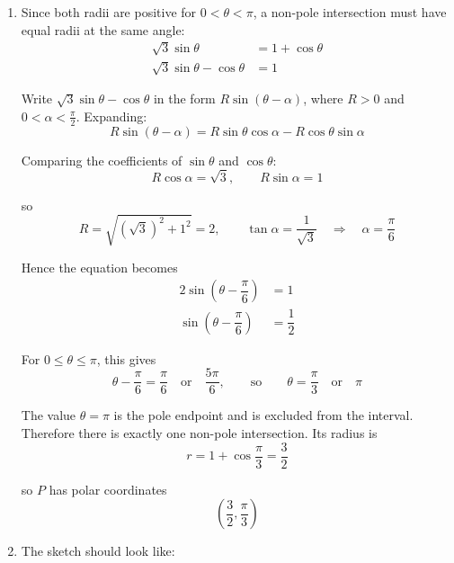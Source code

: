 \documentclass[leqno]{article}
\begin{document}
\begin{enumerate}[
  label=\textbf{\arabic*.},
  leftmargin=*,
  topsep=0pt,
  partopsep=0pt,
  parsep=0pt
]
\begin{djsSolution}
\begin{enumerate}[label=\textbf{(\alph*)}, start=1]
At a non-pole point, \(r\ne0\), so division by \(r\) gives
\[
r=\sqrt{3}\sin\theta
\]

\item Since both radii are positive for \(0<\theta<\pi\), a non-pole intersection must have equal radii at the same angle:
\begin{align*}
\sqrt{3}\sin\theta&=1+\cos\theta\\
\sqrt{3}\sin\theta-\cos\theta&=1
\end{align*}

Write \(\sqrt{3}\sin\theta-\cos\theta\) in the form \(R\sin(\theta-\alpha)\), where \(R>0\) and \(0<\alpha<\frac{\pi}{2}\). Expanding:
\[
R\sin(\theta-\alpha)=R\sin\theta\cos\alpha-R\cos\theta\sin\alpha
\]

Comparing the coefficients of \(\sin\theta\) and \(\cos\theta\):
\[
R\cos\alpha=\sqrt{3},\qquad R\sin\alpha=1
\]

so
\[
R=\sqrt{\left(\sqrt{3}\right)^2+1^2}=2,\qquad
\tan\alpha=\dfrac{1}{\sqrt{3}}
\quad\Longrightarrow\quad
\alpha=\dfrac{\pi}{6}
\]

Hence the equation becomes
\begin{align*}
2\sin\left(\theta-\dfrac{\pi}{6}\right)&=1\\
\sin\left(\theta-\dfrac{\pi}{6}\right)&=\dfrac12
\end{align*}

For \(0\leq\theta\leq\pi\), this gives
\[
\theta-\dfrac{\pi}{6}=\dfrac{\pi}{6}\quad\text{or}\quad\dfrac{5\pi}{6},
\qquad\text{so}\qquad
\theta=\dfrac{\pi}{3}\quad\text{or}\quad\pi
\]

The value \(\theta=\pi\) is the pole endpoint and is excluded from the interval. Therefore there is exactly one non-pole intersection. Its radius is
\[
r=1+\cos\dfrac{\pi}{3}=\dfrac32
\]

so \(P\) has polar coordinates
\[
\left(\dfrac32,\dfrac{\pi}{3}\right)
\]

\item The sketch should look like:\par\nopagebreak



\end{enumerate}
\end{djsSolution}
\end{enumerate}
\end{document}
